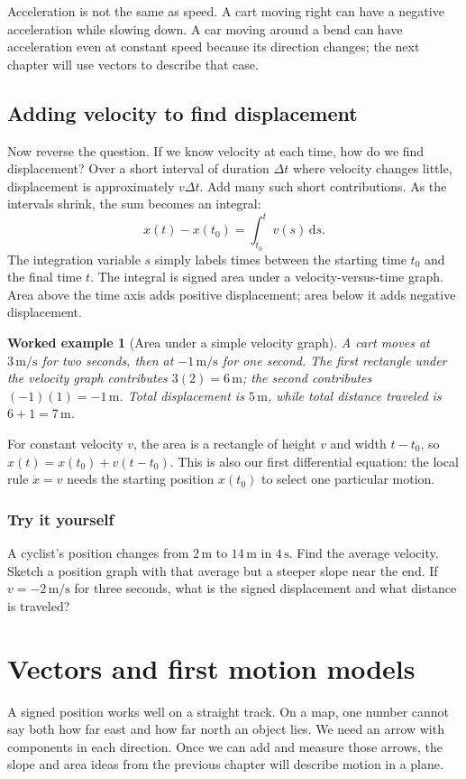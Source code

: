 \documentclass[11pt,oneside]{book}
\newcommand{\dd}{\mathrm{d}}
\theoremstyle{reviewstyle}
\newtheorem{example}{Worked example}[chapter]
\newcommand{\learningcheck}[1]{\subsection*{Try it yourself}\noindent #1\par}
\begin{document}
Acceleration is not the same as speed. A cart moving right can have a negative acceleration while slowing down. A car moving around a bend can have acceleration even at constant speed because its direction changes; the next chapter will use vectors to describe that case.

\section{Adding velocity to find displacement}
Now reverse the question. If we know velocity at each time, how do we find displacement? Over a short interval of duration $\Delta t$ where velocity changes little, displacement is approximately $v\Delta t$. Add many such short contributions. As the intervals shrink, the sum becomes an integral:
\begin{equation}
x(t)-x(t_0)=\int_{t_0}^{t}v(s)\,\dd s.
\end{equation}
The integration variable $s$ simply labels times between the starting time $t_0$ and the final time $t$. The integral is signed area under a velocity-versus-time graph. Area above the time axis adds positive displacement; area below it adds negative displacement.

\begin{example}[Area under a simple velocity graph]
A cart moves at $3\,\mathrm{m/s}$ for two seconds, then at $-1\,\mathrm{m/s}$ for one second. The first rectangle under the velocity graph contributes $3(2)=6\,\mathrm m$; the second contributes $(-1)(1)=-1\,\mathrm m$. Total displacement is $5\,\mathrm m$, while total distance traveled is $6+1=7\,\mathrm m$.
\end{example}

For constant velocity $v$, the area is a rectangle of height $v$ and width $t-t_0$, so $x(t)=x(t_0)+v(t-t_0)$. This is also our first differential equation: the local rule $\dot x=v$ needs the starting position $x(t_0)$ to select one particular motion.

\learningcheck{A cyclist's position changes from $2\,\mathrm m$ to $14\,\mathrm m$ in $4\,\mathrm s$. Find the average velocity. Sketch a position graph with that average but a steeper slope near the end. If $v=-2\,\mathrm{m/s}$ for three seconds, what is the signed displacement and what distance is traveled?}

\chapter{Vectors and first motion models}
A signed position works well on a straight track. On a map, one number cannot say both how far east and how far north an object lies. We need an arrow with components in each direction. Once we can add and measure those arrows, the slope and area ideas from the previous chapter will describe motion in a plane.
\end{document}
